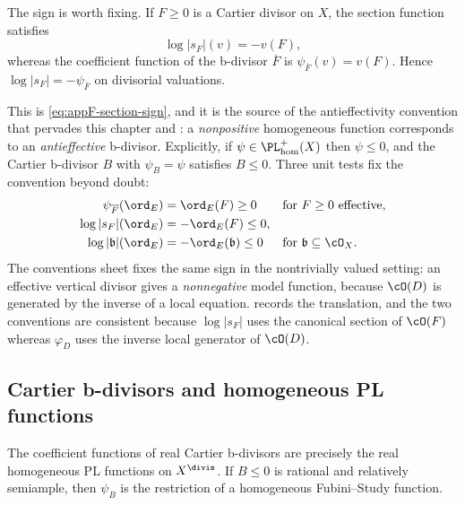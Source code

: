The sign is worth fixing.  If $F\geq0$ is a Cartier divisor on $X$, the
section function satisfies
\begin{equation}
\label{eq:section-bdivisor-sign}
                    \log|s_F|(v)=-v(F),
\end{equation}
whereas the coefficient function of the b-divisor $\overline F$ is
$\psi_{\overline F}(v)=v(F)$.  Hence
$\log|s_F|=-\psi_{\overline F}$ on divisorial valuations.

This is \eqref{eq:appF-section-sign}, and it is the source of the
antieffectivity convention that pervades this chapter and
: a \emph{nonpositive} homogeneous
function corresponds to an \emph{antieffective} b-divisor.  Explicitly, if
$\psi\in\PL^+_{\mathrm{hom}}(X)$ then $\psi\leq0$, and the Cartier
b-divisor $B$ with $\psi_B=\psi$ satisfies $B\leq0$.  Three unit tests
fix the convention beyond doubt:
\begin{equation}
\label{eq:ch35-sign-tests}
\begin{aligned}
 \psi_{\overline F}(\ord_E)&=\ord_E(F)\geq0
 &&\text{for }F\geq0\text{ effective},\\
 \log|s_F|(\ord_E)&=-\ord_E(F)\leq0,\\
 \log|\mathfrak b|(\ord_E)&=-\ord_E(\mathfrak b)\leq0
 &&\text{for }\mathfrak b\subseteq\cO_X .
\end{aligned}
\end{equation}
The conventions sheet fixes the same sign in the nontrivially valued
setting: an effective vertical divisor gives a \emph{nonnegative} model
function, because $\cO(D)$ is generated by the inverse of a local
equation.   records the translation, and the two
conventions are consistent because
$\log|s_F|$ uses the canonical section of $\cO(F)$ whereas
$\varphi_D$ uses the inverse local generator of $\cO(D)$.

\subsection{Cartier b-divisors and homogeneous PL functions}
\label{sec:ch35-cartier-pl}

\begin{proposition}\label{prop:cartier-homogeneous-pl}
The coefficient functions of real Cartier b-divisors are precisely the real
homogeneous PL functions on $X^{\divis}$.  If $B\leq0$ is rational and
relatively semiample, then $\psi_B$ is the restriction of a homogeneous
Fubini--Study function.
\end{proposition}

